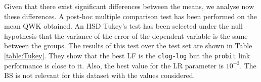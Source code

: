 \documentclass[preprint]{elsarticle}
\begin{document}

Given that there exist significant differences between the means, we analyse now these differences. A post-hoc multiple comparison test has been performed on the mean QWK obtained. An HSD Tukey's test \cite{tukey1949comparing} has been selected under the null hypothesis that the variance of the error of the dependent variable is the same between the groups. The results of this test over the test set are shown in Table \ref{table:Tukey}. They show that the best LF is the \texttt{clog-log} but the \texttt{probit} link performance is close to it. Also, the best value for the LR parameter is $10^{-3}$. The BS is not relevant for this dataset with the values considered.
\end{document}
